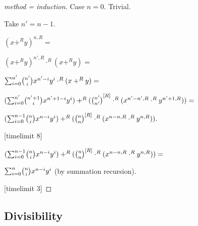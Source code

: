 \documentclass[11pt]{article}
\begin{document}
\begin{forthel}
\begin{proof}[method = induction]
Case $n = 0$. Trivial.

Take $n' = n-1$.

$(x +^{R} y)^{n,R} =$

$(x +^{R} y)^{n',R} \cdot^{R} (x +^{R} y) =$

$\binsum{n'}{n'}{x}{y}{R} \cdot^{R} (x +^{R} y) =$

$(\binsum{n'}{n'+1}{x}{y}{R}) +^{R} (\cho{n'}{n'}^{[R]} \cdot^{R} (x^{n'-n',R} \cdot^{R} y^{n'+1,R})) =$

$(\binsum{n-1}{n}{x}{y}{R}) +^{R} (\cho{n}{n}^{[R]} \cdot^{R} (x^{n-n,R} \cdot^{R} y^{n,R})).$

[timelimit 8]


$(\binsum{n-1}{n}{x}{y}{R}) +^{R} (\cho{n}{n}^{[R]} \cdot^{R} (x^{n-n,R} \cdot^{R} y^{n,R})) =$

$\binsum{n}{n}{x}{y}{R}$ (by summation recursion).

[timelimit 3]

\end{proof}

\end{forthel}

\subsection{Divisibility} 
\end{document}
